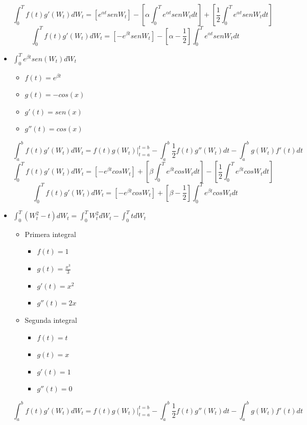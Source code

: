 \documentclass[11pt,fleqn]{book} %
\numberwithin{equation}{section} %
\numberwithin{figure}{section} %
\numberwithin{table}{section} %
\begin{document}
\begin{itemize}
    $$ \int_{0}^{T} f(t)g'(W_t)dW_t= [e^{\alpha t} senW_{t}] - [\alpha \int_{0}^{T} e^{\alpha t} senW_{t} dt ] + [\frac{1}{2} \int_{0}^{T} e^{\alpha t} senW_{t} dt] $$
    $$ \int_{0}^{T} f(t)g'(W_t)dW_t= [-e^{\beta t} senW_{t}] - [\alpha - \frac{1}{2}] \int_{0}^{T} e^{\alpha t} senW_{t} dt $$
    \item $\int_{0}^{T} e^{\beta t} sen(W_{t}) dW_{t}   $
        \begin{itemize}
            \item $f(t) = e^{\beta t} $
            \item $g(t) = -cos(x)$
            \item $g'(t) = sen(x)$
            \item $g''(t) = cos(x)$
        \end{itemize}
    $$\int^{b}_{a} f(t)g'(W_t)dW_t= f(t)g(W_t)|^{t=b}_{t=a}-\int^{b}_{a} \frac{1}{2}f(t)g''(W_t)dt-\int^{b}_{a} g(W_t)f'(t)dt$$
    $$ \int_{0}^{T} f(t)g'(W_t)dW_t= [-e^{\beta t} cosW_{t}] + [\beta \int_{0}^{T} e^{\beta t} cosW_{t} dt ] - [\frac{1}{2} \int_{0}^{T} e^{\beta t} cosW_{t} dt] $$
    $$ \int_{0}^{T} f(t)g'(W_t)dW_t= [-e^{\beta t} cosW_{t}] + [\beta - \frac{1}{2}] \int_{0}^{T} e^{\beta t} cosW_{t} dt $$
    \item $\int_{0}^{T} (W_{t}^{2} -t)dW_{t} = \int_{0}^{T} W_{t}^{2} dW_{t} - \int_{0}^{T} t dW_{t} $
        \begin{itemize}
        \item Primera integral
            \begin{itemize}
                \item $f(t) = 1 $
                \item $g(t) = \frac{x^3}{3} $
                \item $g'(t) = x^{2}$
                \item $g''(t) = 2x$
            \end{itemize}    
        \item Segunda integral
            \begin{itemize}
                \item $f(t) = t $
                \item $g(t) = x$
                \item $g'(t) = 1$
                \item $g''(t) = 0$
            \end{itemize}  
        \end{itemize}
    $$\int^{b}_{a} f(t)g'(W_t)dW_t= f(t)g(W_t)|^{t=b}_{t=a}-\int^{b}_{a} \frac{1}{2}f(t)g''(W_t)dt-\int^{b}_{a} g(W_t)f'(t)dt$$

\end{itemize}
\end{document}
